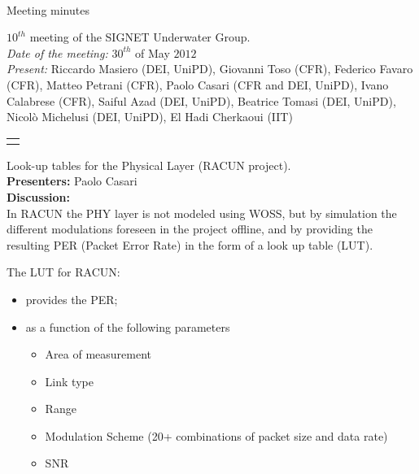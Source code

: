\documentclass[11pt,journal,draftclsnofoot,onecolumn,twoside,letterpaper]{IEEEtran}
\theoremstyle{definition} \newtheorem{definition}[]{Definition}
\theoremstyle{theorem} \newtheorem{theorem}[]{Theorem}
\begin{document}
\pagestyle{empty}

\begin{Large} \\ \end{Large}
\begin{large} {Meeting minutes} \end{large}

\vspace{0.8cm}

 $10^{th}$ meeting of the SIGNET Underwater Group.\\
{\it Date of the meeting: } $30^{th}$ of May $2012$\\
{\it Present: } Riccardo Masiero (DEI, UniPD), Giovanni Toso (CFR), Federico Favaro (CFR), Matteo Petrani (CFR), Paolo Casari (CFR and DEI, UniPD), Ivano Calabrese (CFR), Saiful Azad (DEI, UniPD), Beatrice Tomasi (DEI, UniPD), Nicol\`o Michelusi (DEI, UniPD),  El Hadi Cherkaoui (IIT)\\

\vspace{0.5cm}

\begin{tabular}{p{}}
 \hline \\
\end{tabular}


 Look-up tables for the Physical Layer (RACUN project).\\
{\bf Presenters:} Paolo Casari\\

{\bf Discussion:}\\

In RACUN the PHY layer is not modeled using WOSS, but by simulation the different modulations foreseen in the project offline, and by providing the resulting PER (Packet Error Rate) in the form of a look up table (LUT).

The LUT for RACUN:
\begin{itemize}
  \item provides the PER;
  \item as a function of the following parameters
    \begin{itemize}
      \item Area of measurement
      \item Link type
      \item Range
      \item Modulation Scheme (20+ combinations of packet size and data rate)
      \item SNR
    \end{itemize}
\end{itemize}
\end{document}
